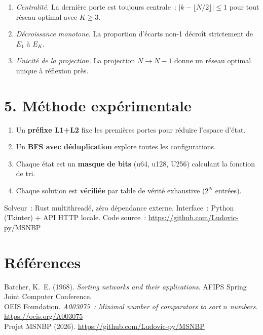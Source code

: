 \documentclass[11pt,a4paper]{article}
\theoremstyle{propretheoreme}
\theoremstyle{proprepreuve}
\theoremstyle{proprecorollaire}
\begin{document}
\begin{enumerate}
\item[\textbf{1.}] \emph{Centralité.} La dernière porte est toujours centrale~: $|k - \lfloor N/2\rfloor| \le 1$ pour tout réseau optimal avec $K\ge3$.
\item[\textbf{2.}] \emph{Décroissance monotone.} La proportion d'écarts non-1 décroît strictement de $E_1$ à $E_K$.
\item[\textbf{3.}] \emph{Unicité de la projection.} La projection $N\to N-1$ donne un réseau optimal unique à réflexion près.
\end{enumerate}

\section*{5. Méthode expérimentale}

\begin{enumerate}
\item Un \textbf{préfixe L1+L2} fixe les premières portes pour réduire l'espace d'état.
\item Un \textbf{BFS avec déduplication} explore toutes les configurations.
\item Chaque état est un \textbf{masque de bits} (u64, u128, U256) calculant la fonction de tri.
\item Chaque solution est \textbf{vérifiée} par table de vérité exhaustive ($2^N$ entrées).
\end{enumerate}

Solveur~: Rust multithreadé, zéro dépendance externe. Interface~: Python (Tkinter) + API HTTP locale.
Code source~: \url{https://github.com/Ludovic-py/MSNBP}

\section*{Références}

\noindent
Batcher, K.~E. (1968). \textit{Sorting networks and their applications}. AFIPS Spring Joint Computer Conference.\\
OEIS Foundation. \textit{A003075~: Minimal number of comparators to sort $n$ numbers}. \url{https://oeis.org/A003075}\\
Projet MSNBP (2026). \url{https://github.com/Ludovic-py/MSNBP}
\end{document}

